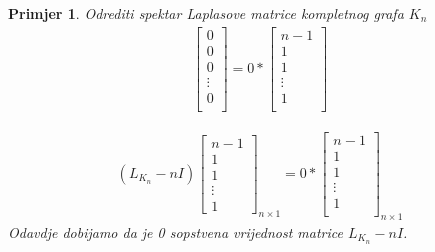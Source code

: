 \documentclass[11pt]{article}
\newtheorem{example}{Primjer}
\begin{document}
\begin{example}{Odrediti spektar Laplasove matrice kompletnog grafa $K_n$}
\[\begin{split}
\begin{bmatrix}
	0 \\
	0 \\
	0 \\
	\vdots \\
	0 \\
	\end{bmatrix}
	= 0 *
	\begin{bmatrix}
	n-1 \\
	1 \\
	1 \\
	\vdots \\
	1 \\
	\end{bmatrix}
	\end{split}
	\]
	
	\[
	\begin{split}
	(L_{K_n} - nI) 
	\begin{bmatrix}
	n-1 \\
	1 \\
	1 \\
	\vdots \\
	1
	\end{bmatrix}_{n \times 1}
	= 0 *
	\begin{bmatrix}
	n-1 \\
	1 \\
	1 \\
	\vdots \\
	1 \\
	\end{bmatrix}_{n \times 1} 
	\end{split}
	\]
	Odavdje dobijamo da je 0 sopstvena vrijednost matrice $L_{K_n} - nI$. 
	\end{example}
	
\end{document}
